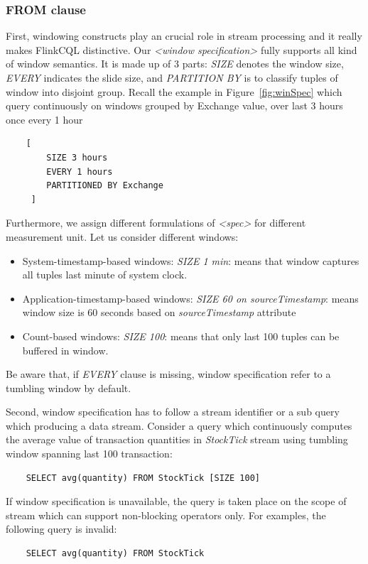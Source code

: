 \subsubsection*{FROM clause}
First, windowing constructs play an crucial role in stream processing and it really makes FlinkCQL distinctive. Our \textit{<window specification>} fully supports all kind of window semantics. It is made up of 3 parts: \textit{SIZE} denotes the window size, \textit{EVERY} indicates the slide size, and \textit{PARTITION BY} is to classify tuples of window into disjoint group. Recall the example in Figure~\ref{fig:winSpec} which query continuously on   windows grouped by Exchange value, over last 3 hours once every 1 hour
\begin{lstlisting}
	[
		SIZE 3 hours 
		EVERY 1 hours 
	 	PARTITIONED BY Exchange
	 ]
\end{lstlisting}

Furthermore, we assign different formulations of \textit{<spec>} for different measurement unit. Let us consider different windows:
\begin{itemize}
	\item System-timestamp-based windows: \textit{SIZE 1 min}: means that window captures all tuples last minute of system clock.
	\item Application-timestamp-based windows: \textit{SIZE 60 on sourceTimestamp}: means window size is 60 seconds based on \textit{sourceTimestamp} attribute
	\item Count-based windows: \textit{SIZE 100}: means that only last 100 tuples can be buffered in window.
\end{itemize}
Be aware that, if \textit{EVERY} clause is missing, window specification refer to a tumbling window by default.


Second, window specification has to follow a stream identifier or a sub query which producing a data stream. Consider a query which continuously computes the average value of transaction quantities in \textit{StockTick} stream using tumbling window spanning last 100 transaction:

\begin{verbatim}
	SELECT avg(quantity) FROM StockTick [SIZE 100]
\end{verbatim}

If window specification is unavailable, the query is taken place on the scope of stream which can support non-blocking operators only. For examples, the following query is invalid:
\begin{lstlisting}
	SELECT avg(quantity) FROM StockTick
\end{lstlisting}

